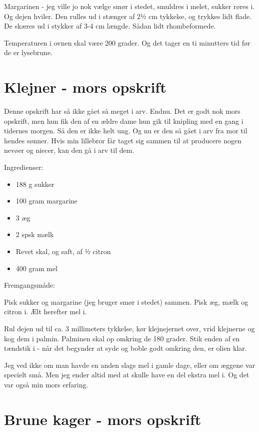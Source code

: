 \documentclass[
  letterpaper,
  DIV=11,
  numbers=noendperiod]{scrreprt}
\providecommand{\tightlist}{%
  \setlength{\itemsep}{0pt}\setlength{\parskip}{0pt}}\usepackage{longtable,booktabs,array}
\begin{document}
Margarinen - jeg ville jo nok vælge smør i stedet, smuldres i melet,
sukker røres i. Og dejen hviler. Den rulles ud i stænger af 2½ cm
tykkelse, og trykkes lidt flade. De skæres ud i stykker af 3-4 cm
længde. Sådan lidt rhombeformede.

Temperaturen i ovnen skal være 200 grader. Og det tager en ti minutters
tid før de er lysebrune.

\hypertarget{klejner---mors-opskrift-1}{%
\section{Klejner - mors opskrift}\label{klejner---mors-opskrift-1}}

Denne opskrift har så ikke gået så meget i arv. Endnu. Det er godt nok
mors opskrift, men hun fik den af en ældre dame hun gik til knipling med
en gang i tidernes morgen. Så den er ikke helt ung. Og nu er den så gået
i arv fra mor til hendes sønner. Hvis min lillebror får taget sig sammen
til at producere nogen nevøer og niecer, kan den gå i arv til dem.

Ingredienser:

\begin{itemize}
\tightlist
\item
  188 g sukker
\item
  100 gram margarine
\item
  3 æg
\item
  2 spsk mælk
\item
  Revet skal, og saft, af ½ citron
\item
  400 gram mel
\end{itemize}

Fremgangsmåde:

Pisk sukker og margarine (jeg bruger smør i stedet) sammen. Pisk æg,
mælk og citron i. Ælt herefter mel i.

Rul dejen ud til ca. 3 millimeters tykkelse, kør klejnejernet over, vrid
klejnerne og kog dem i palmin. Palminen skal op omkring de 180 grader.
Stik enden af en tændstik i - når det begynder at syde og boble godt
omkring den, er olien klar.

Jeg ved ikke om man havde en anden slags mel i gamle dage, eller om
æggene var specielt små. Men jeg ender altid med at skulle have en del
ekstra mel i. Og det var også min mors erfaring.

\hypertarget{brune-kager---mors-opskrift-1}{%
\section{Brune kager - mors
opskrift}\label{brune-kager---mors-opskrift-1}}
\end{document}

